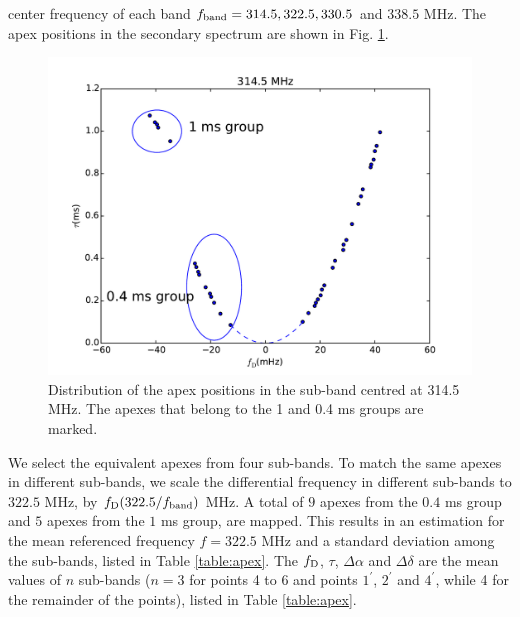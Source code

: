 \documentclass[useAMS,usenatbib]{mn2e}
\begin{document}
center frequency of each band $f_{\rm band}=314.5, 322.5, 330.5$ and $
338.5$ MHz.  The apex positions in the secondary spectrum are shown
in Fig. \ref{fig:apex_pos}. 
\begin{figure}
\centering
\includegraphics[width=\linewidth]{apex_pos_Nov25.pdf}
\caption{Distribution of the apex positions in the sub-band centred at
  314.5 MHz.  The apexes that belong to the 1 and 0.4 ms groups are marked.}
\label{fig:apex_pos}
\end{figure}

We select the equivalent apexes from four sub-bands.  To match the same apexes in different sub-bands, we scale the differential frequency in different sub-bands to $322.5$ MHz, by $f_{\rm D} (322.5/f_{\rm band})$ MHz.  A total of $9$ apexes from the $0.4$ ms group and $5$ apexes from the $1$ ms
group, are mapped.  This results in an estimation
for the mean referenced frequency $f=322.5$ MHz and a standard
deviation among the sub-bands, listed in Table
\ref{table:apex}.  The $f_{\rm D}$, $\tau$, $\Delta\alpha$ and $\Delta\delta$
are the mean values of $n$ sub-bands
($n=3$ for points 4 to 6 and points $1^\prime$, $2^\prime$ and $4^\prime$, while 4 for the remainder of the points), listed
in Table \ref{table:apex}. 
\end{document}
